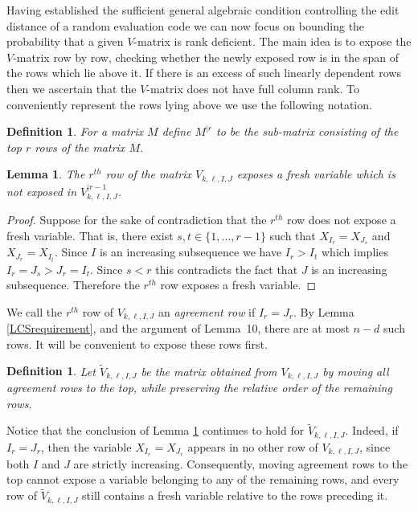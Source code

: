 \documentclass[draft, onecolumn, 11pt]{IEEEtran}
\newtheorem{definition}[theorem]{Definition}
\newtheorem{lemma}[theorem]{Lemma}
\begin{document}
Having established the sufficient general algebraic condition controlling the edit distance of a random evaluation code we can now focus on bounding the probability that a given $V$-matrix is rank deficient. The main idea is to expose the $V$-matrix row by row, checking whether the newly exposed row is in the span of the rows which lie above it. If there is an excess of such linearly dependent rows then we ascertain that the $V$-matrix does not have full column rank. To conveniently represent the rows lying above we use the following notation.

\begin{definition}
    For a matrix $M$ define $M^{|r}$ to be the sub-matrix consisting of the top $r$ rows of the matrix $M$. 
\end{definition}

\begin{lemma}\label{freshvariables}
    The $r^{th}$ row of the matrix $V_{k,\ell,I,J}$ exposes a fresh variable which is not exposed in $V_{k,\ell,I,J}^{|r-1}$.
\end{lemma}
\begin{proof}
    Suppose for the sake of contradiction that the $r^{th}$ row does not expose a fresh variable. That is, there exist $s,t \in \{1, \dots, r-1\}$ such that $X_{I_r} = X_{J_s}$ and $X_{J_r} = X_{I_t}$.
    Since $I$ is an increasing subsequence we have $I_r > I_t$ which implies $I_r = J_s > J_r = I_t$. Since $s < r$ this contradicts the fact that $J$ is an increasing subsequence. Therefore the $r^{th}$ row exposes a fresh variable. 
\end{proof}

We call the $r^{th}$ row of $V_{k,\ell,I,J}$ an \emph{agreement row} if $I_r=J_r$. By Lemma \ref{LCSrequirement}, and the argument of Lemma~10, there are at most $n-d$ such rows. It will be convenient to expose these rows first.

\begin{definition}
    Let $\widetilde{V}_{k,\ell,I,J}$ be the matrix obtained from $V_{k,\ell,I,J}$ by moving all agreement rows to the top, while preserving the relative order of the remaining rows.
\end{definition}

Notice that the conclusion of Lemma \ref{freshvariables} continues to hold for $\widetilde{V}_{k,\ell,I,J}$. Indeed, if $I_r = J_r$, then the variable $X_{I_r}=X_{J_r}$ appears in no other row of $V_{k,\ell,I,J}$, since both $I$ and $J$ are strictly increasing. Consequently, moving agreement rows to the top cannot expose a variable belonging to any of the remaining rows, and every row of $\widetilde{V}_{k,\ell,I,J}$ still contains a fresh variable relative to the rows preceding it.
\end{document}
